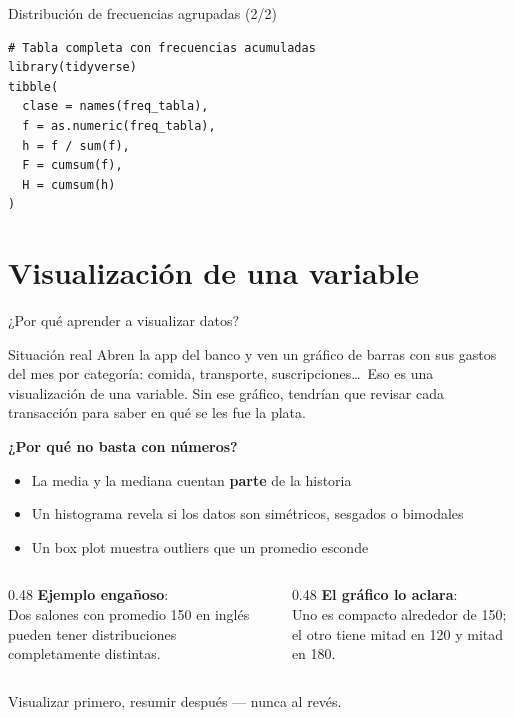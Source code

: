 \documentclass[aspectratio=169, 11pt]{beamer}
\begin{document}
\begin{frame}[fragile]{Distribución de frecuencias agrupadas (2/2)}
\begin{lstlisting}
# Tabla completa con frecuencias acumuladas
library(tidyverse)
tibble(
  clase = names(freq_tabla),
  f = as.numeric(freq_tabla),
  h = f / sum(f),
  F = cumsum(f),
  H = cumsum(h)
)
\end{lstlisting}
\end{frame}

\section{Visualización de una variable}

\begin{frame}{¿Por qué aprender a visualizar datos?}
\begin{exampleblock}{Situación real}
Abren la app del banco y ven un gr\'afico de barras con sus gastos del mes por categor\'ia: comida, transporte, suscripciones\ldots\
Eso es una visualizaci\'on de una variable. Sin ese gr\'afico, tendr\'ian que revisar cada transacci\'on para saber en qu\'e se les fue la plata.
\end{exampleblock}

\textbf{¿Por qu\'e no basta con n\'umeros?}
\begin{itemize}
\item La media y la mediana cuentan \textbf{parte} de la historia
\item Un histograma revela si los datos son sim\'etricos, sesgados o bimodales
\item Un box plot muestra outliers que un promedio esconde
\end{itemize}

\begin{columns}[T]
\begin{column}{0.48\textwidth}
\textbf{Ejemplo engañoso}:\\
Dos salones con promedio 150 en ingl\'es pueden tener distribuciones completamente distintas.
\end{column}
\begin{column}{0.48\textwidth}
\textbf{El gráfico lo aclara}:\\
Uno es compacto alrededor de 150; el otro tiene mitad en 120 y mitad en 180.
\end{column}
\end{columns}

\vspace{0.3em}
\alert{Visualizar primero, resumir despu\'es --- nunca al rev\'es.}
\end{frame}
\end{document}
